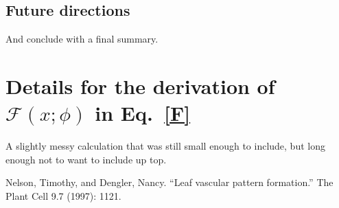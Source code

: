 \documentclass[pre,12pt]{revtex4-1}
\begin{document}
\subsection{Future directions}

And conclude with a final summary. 

\appendix

\section{Details for the derivation of $\mathcal{F}(x;\phi)$ in Eq.~\eqref{F}}\label{AppendixA}

A slightly messy calculation that was still small enough to include, but long enough not to want to include up top.

\begin{thebibliography}{10}
 Nelson, Timothy, and Dengler, Nancy. ``Leaf vascular pattern formation.'' The Plant Cell 9.7 (1997): 1121.
\end{thebibliography}
\end{document}
